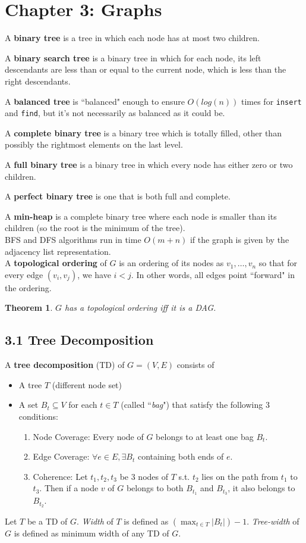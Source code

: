 \documentclass{report}
\newtheorem{Theorem}{Theorem}
\begin{document}
\section*{Chapter 3: Graphs}
A \textbf{binary tree} is a tree in which each node has at most two children.

A \textbf{binary search tree} is a binary tree in which for each node, its left descendants are less than or equal to the current node, which is less than the right descendants.

A \textbf{balanced tree} is ``balanced" enough to ensure $O(log(n))$ times for \texttt{insert} and \texttt{find}, but it's not necessarily as
balanced as it could be.

A \textbf{complete binary tree} is a binary tree which is totally filled, other than possibly the rightmost elements on the last
level.

A \textbf{full binary tree} is a binary tree in which every node has either zero or two children.

A \textbf{perfect binary tree} is one that is both full and complete.

A \textbf{min-heap} is a complete binary tree where each node is smaller than its children (so the root is the minimum of the tree).\\

BFS and DFS algorithms run in time $O(m + n)$ if the graph is given by the adjacency list representation.\\

A \textbf{topological ordering} of $G$ is an ordering of its nodes as $v_1,\ldots,v_n$ so that for every edge $(v_i,v_j)$, we have $i<j$. In other words, all edges point ``forward" in the ordering.

\begin{Theorem}
	$G$ has a topological ordering iff it is a DAG.
\end{Theorem}

\subsection*{3.1 Tree Decomposition}
A \textbf{tree decomposition} (TD) of $G=(V,E)$ consists of 
\begin{itemize}
	\item A tree $T$ (different node set)
	\item A set $B_t\subseteq V$ for each $t\in T$ (called ``\emph{bag}") that satisfy the following 3 conditions:
	\begin{enumerate}
		\item Node Coverage: Every node of $G$ belongs to at least one bag $B_t$.
		\item Edge Coverage: $\forall e\in E, \exists B_t$ containing both ends of $e$.
		\item Coherence: Let $t_1, t_2, t_3$ be 3 nodes of $T$ s.t. $t_2$ lies on the path from $t_1$ to $t_3$. Then if a node $v$ of $G$ belongs to both $B_{t_1}$ and $B_{t_3}$, it also belongs to $B_{t_2}$.
	\end{enumerate}
\end{itemize}
Let $T$ be a TD of $G$. \emph{Width} of $T$ is defined as $(\max_{t\in T} |B_t|) -1$. \emph{Tree-width} of $G$ is defined as minimum width of any TD of $G$.
\end{document}
